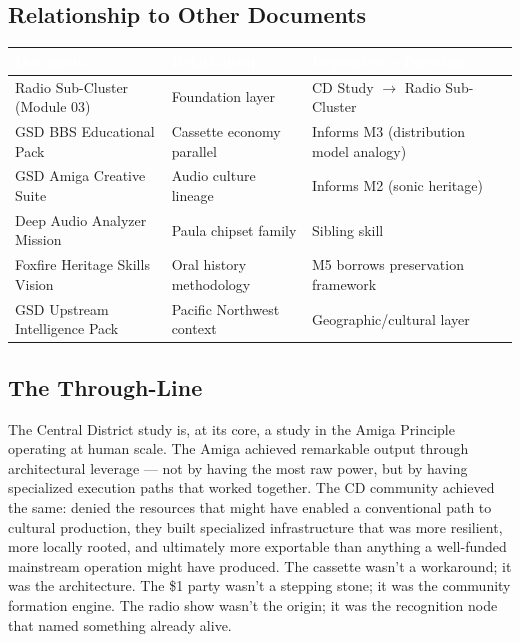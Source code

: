 \documentclass[11pt,letterpaper]{article}
\newcommand{\tableheader}[1]{\textbf{\sffamily\textcolor{white}{#1}}}
\begin{document}
\subsection{Relationship to Other Documents}

\begin{center}
\begin{tabularx}{\textwidth}{L{5cm}L{4cm}X}
\toprule
{}
\tableheader{Document} & \tableheader{Relationship} & \tableheader{Dependency Direction} \\
\midrule
Radio Sub-Cluster (Module 03) & Foundation layer & CD Study $\rightarrow$ Radio Sub-Cluster \\
GSD BBS Educational Pack & Cassette economy parallel & Informs M3 (distribution model analogy) \\
GSD Amiga Creative Suite & Audio culture lineage & Informs M2 (sonic heritage) \\
Deep Audio Analyzer Mission & Paula chipset family & Sibling skill \\
Foxfire Heritage Skills Vision & Oral history methodology & M5 borrows preservation framework \\
GSD Upstream Intelligence Pack & Pacific Northwest context & Geographic/cultural layer \\
\bottomrule
\end{tabularx}
\end{center}

\subsection{The Through-Line}

The Central District study is, at its core, a study in the Amiga Principle operating at human scale. The Amiga achieved remarkable output through architectural leverage --- not by having the most raw power, but by having specialized execution paths that worked together. The CD community achieved the same: denied the resources that might have enabled a conventional path to cultural production, they built specialized infrastructure that was more resilient, more locally rooted, and ultimately more exportable than anything a well-funded mainstream operation might have produced. The cassette wasn't a workaround; it was the architecture. The \$1 party wasn't a stepping stone; it was the community formation engine. The radio show wasn't the origin; it was the recognition node that named something already alive.
\end{document}
